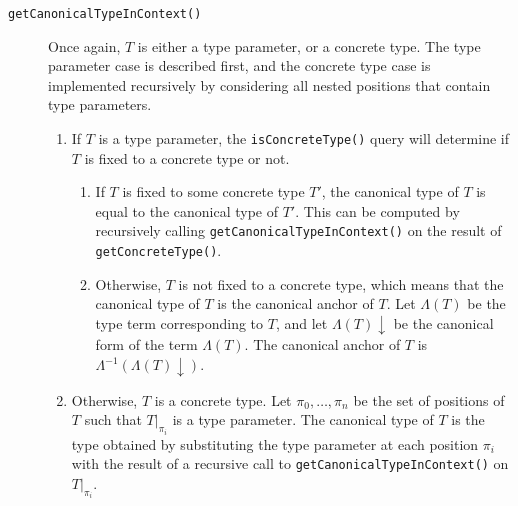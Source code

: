 \documentclass[a4paper,headsepline,bibliography=totoc,toc=flat,fleqn,twoside=semi]{scrbook}
\theoremstyle{definition}
\theoremstyle{definition}
\theoremstyle{definition}
\begin{document}
\begin{description}
\item[\texttt{getCanonicalTypeInContext()}] Once again, $T$ is either a type parameter, or a concrete type. The type parameter case is described first, and the concrete type case is implemented recursively by considering all nested positions that contain type parameters.
\begin{enumerate}
\item
If $T$ is a type parameter, the \texttt{isConcreteType()} query will determine if $T$ is fixed to a concrete type or not.
\begin{enumerate}
\item If $T$ is fixed to some concrete type $T'$, the canonical type of $T$ is equal to the canonical type of $T'$. This can be computed by recursively calling \texttt{getCanonicalTypeInContext()} on the result of \texttt{getConcreteType()}.
\item Otherwise, $T$ is not fixed to a concrete type, which means that the canonical type of $T$ is the canonical anchor of $T$. Let $\Lambda(T)$ be the type term corresponding to $T$, and let $\Lambda(T){\downarrow}$ be the canonical form of the term $\Lambda(T)$. The canonical anchor of $T$ is $\Lambda^{-1}(\Lambda(T){\downarrow})$.
\end{enumerate}

\item
Otherwise, $T$ is a concrete type. Let $\pi_0,\ldots,\pi_n$ be the set of positions of $T$ such
that $T|_{\pi_i}$ is a type parameter. The canonical type of $T$ is the type obtained by substituting the type parameter at each position $\pi_i$ with the result of a recursive call to \texttt{getCanonicalTypeInContext()} on $T|_{\pi_i}$.
\end{enumerate}
\end{description}
\end{document}
